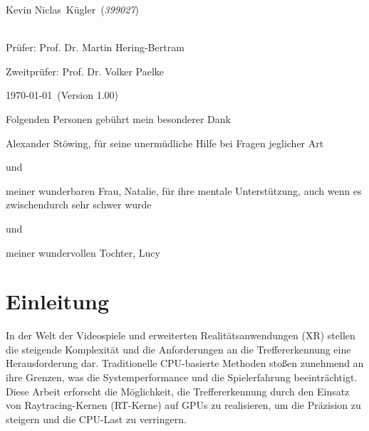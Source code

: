 \documentclass[11pt]{scrartcl}
\newcommand{\MetaAuthorName}{Kevin Niclas}
\newcommand{\MetaAuthorSurname}{Kügler}
\newcommand{\MetaAuthor}{\MetaAuthorName~\MetaAuthorSurname}
\newcommand{\MetaStudentNumber}{\textit{399027}}
\newcommand{\MetaExaminer}{Prof. Dr. Martin Hering-Bertram}
\newcommand{\MetaCoExaminer}{Prof. Dr. Volker Paelke}
\newcommand{\MetaDate}{\germandate\today}
\newcommand{\MetaVersion}{1.00}
\begin{document}
\begin{titlepage}
		\large 
		\MetaAuthor\ (\MetaStudentNumber)

		~\\

		Prüfer: \MetaExaminer
		
		Zweitprüfer: \MetaCoExaminer
		
		\vspace*{\fill}
		{
			\large \MetaDate\ (Version \MetaVersion)
		}
	\end{titlepage}
	
	\pagebreak
	\tableofcontents
	\pagebreak
	
	\newpage
	\thispagestyle{empty} %
	
	\vspace*{\fill}
	\begin{center}
		Folgenden Personen gebührt mein besonderer Dank
		
		\vspace{0.5cm}
		Alexander Stöwing, für seine unermüdliche Hilfe bei Fragen jeglicher Art
		
		 und
		
		meiner wunderbaren Frau, Natalie, für ihre mentale Unterstützung, auch wenn es zwischendurch sehr schwer wurde
		
		und
		
		meiner wundervollen Tochter, Lucy
	\end{center}
	\vspace*{\fill}


	\pagebreak
	\section{Einleitung}
	
	In der Welt der Videospiele und erweiterten Realitätsanwendungen (XR) stellen die steigende Komplexität und die Anforderungen an die Treffererkennung eine Herausforderung dar. Traditionelle CPU-basierte Methoden stoßen zunehmend an ihre Grenzen, was die Systemperformance und die Spielerfahrung beeinträchtigt. Diese Arbeit erforscht die Möglichkeit, die Treffererkennung durch den Einsatz von Raytracing-Kernen (RT-Kerne) auf GPUs zu realisieren, um die Präzision zu steigern und die CPU-Last zu verringern.
\end{document}
